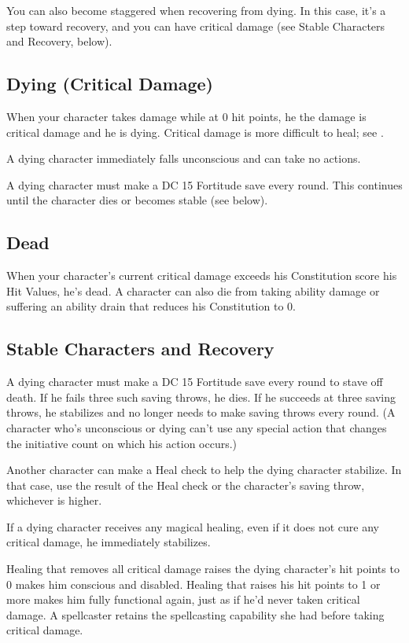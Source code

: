 You can also become staggered when recovering from dying. In this case, it's a step toward recovery, and you can have critical damage (see Stable Characters and Recovery, below).

\subsection{Dying (Critical Damage)}
When your character takes damage while at 0 hit points, he the damage is critical damage and he is dying. Critical damage is more difficult to heal; see .

A dying character immediately falls unconscious and can take no actions.

A dying character must make a DC 15 Fortitude save every round. This continues until the character dies or becomes stable (see below).

\subsection{Dead}
When your character's current critical damage exceeds his Constitution score \add his Hit Values, he's dead. A character can also die from taking ability damage or suffering an ability drain that reduces his Constitution to 0.

\subsection{Stable Characters and Recovery}
A dying character must make a DC 15 Fortitude save every round to stave off death. If he fails three such saving throws, he dies. If he succeeds at three saving throws, he stabilizes and no longer needs to make saving throws every round. (A character who's unconscious or dying can't use any special action that changes the initiative count on which his action occurs.)

\par Another character can make a Heal check to help the dying character stabilize. In that case, use the result of the Heal check or the character's saving throw, whichever is higher.

\par If a dying character receives any magical healing, even if it does not cure any critical damage, he immediately stabilizes.

\par Healing that removes all critical damage raises the dying character's hit points to 0 makes him conscious and disabled. Healing that raises his hit points to 1 or more makes him fully functional again, just as if he'd never taken critical damage. A spellcaster retains the spellcasting capability she had before taking critical damage.

